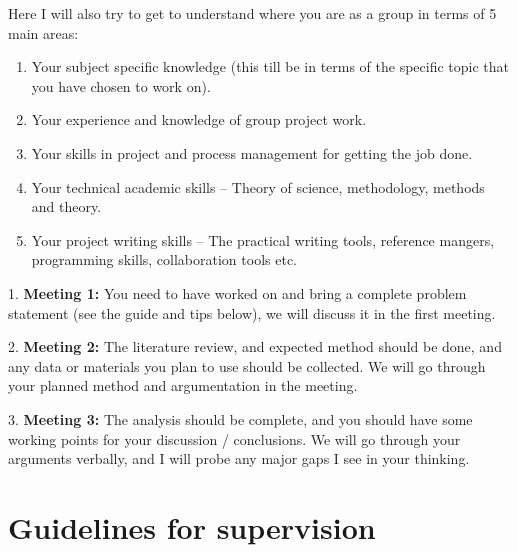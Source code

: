 \documentclass[
]{book}
\begin{document}
Here I will also try to get to understand where you are as a group in
terms of 5 main areas:

\begin{enumerate}
\def\labelenumi{\arabic{enumi}.}
\item
  Your subject specific knowledge (this till be in terms of the
  specific topic that you have chosen to work on).
\item
  Your experience and knowledge of group project work.
\item
  Your skills in project and process management for getting the job
  done.
\item
  Your technical academic skills -- Theory of science, methodology,
  methods and theory.
\item
  Your project writing skills -- The practical writing tools,
  reference mangers, programming skills, collaboration tools etc.
\end{enumerate}

1. \textbf{Meeting 1:} You need to have worked on and bring a complete
problem statement (see the guide and tips below), we will discuss it in
the first meeting.

2. \textbf{Meeting 2:} The literature review, and expected method should be
done, and any data or materials you plan to use should be collected. We
will go through your planned method and argumentation in the meeting.

3. \textbf{Meeting 3:} The analysis should be complete, and you should have
some working points for your discussion / conclusions. We will go
through your arguments verbally, and I will probe any major gaps I see
in your thinking.

\hypertarget{guidelines-for-supervision}{%
\chapter{Guidelines for supervision}\label{guidelines-for-supervision}}
\end{document}
